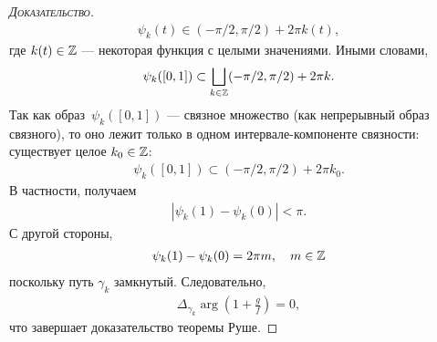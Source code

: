 \documentclass[../complex-analysis.tex]{subfiles}
\begin{document}
\begin{proof}[\normalfont\textsc{Доказательство}]
 \begin{align*}
  \psi_k(t) \in (-\pi / 2, \pi / 2) + 2\pi k(t),
 \end{align*} где $ k(t) \in \mathbb{Z} $ --- некоторая функция с целыми значениями. Иными словами,
 \begin{align*}
  \psi_k([0,1]) \subset \bigsqcup_{k\in\mathbb{Z}} (-\pi / 2, \pi / 2) + 2\pi k.
 \end{align*} Так как образ~$ \psi_k([0,1]) $ --- связное множество (как непрерывный образ связного), то оно лежит только в одном интервале-компоненте связности: существует целое $ k_0 \in \mathbb{Z} $:
 \begin{align*}
  \psi_k([0,1]) \subset (-\pi / 2, \pi / 2) + 2\pi k_0.
 \end{align*} В частности, получаем
 \begin{align*}
  \left| \psi_k(1) - \psi_k(0) \right| < \pi.
 \end{align*} С другой стороны,
 \begin{align*}
  \psi_k(1) - \psi_k(0) = 2\pi m, \quad m\in\mathbb{Z}
 \end{align*} поскольку путь $ \gamma_k $ замкнутый. Следовательно,
 \begin{align*}
  \Delta_{\gamma_k} \arg \left( 1 + \frac{g}{f} \right) = 0,
 \end{align*} что завершает доказательство теоремы Руше.
\end{proof}
\end{document}
